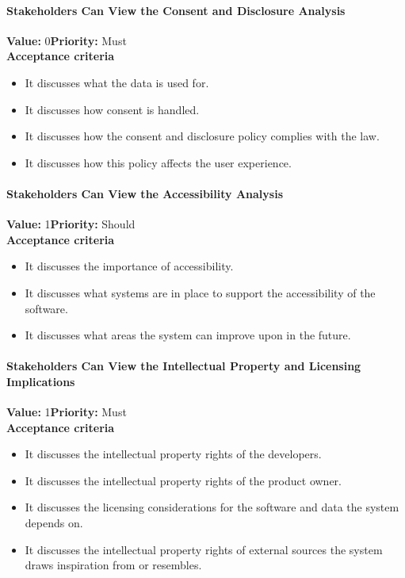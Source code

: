 \paragraph{Stakeholders Can View the Consent and Disclosure Analysis}
\textbf{Value:} 0\quad \textbf{Priority:} Must\\
\textbf{Acceptance criteria}
\begin{itemize}
  \item It discusses what the data is used for.
  \item It discusses how consent is handled.
  \item It discusses how the consent and disclosure policy complies with the law.
  \item It discusses how this policy affects the user experience.
\end{itemize}

\paragraph{Stakeholders Can View the Accessibility Analysis}
\textbf{Value:} 1\quad \textbf{Priority:} Should\\
\textbf{Acceptance criteria}
\begin{itemize}
  \item It discusses the importance of accessibility.
  \item It discusses what systems are in place to support the accessibility of the software.
  \item It discusses what areas the system can improve upon in the future.
\end{itemize}

\paragraph{Stakeholders Can View the Intellectual Property and Licensing Implications}
\textbf{Value:} 1\quad \textbf{Priority:} Must\\
\textbf{Acceptance criteria}
\begin{itemize}
  \item It discusses the intellectual property rights of the developers.
  \item It discusses the intellectual property rights of the product owner.
  \item It discusses the licensing considerations for the software and data the system depends on.
  \item It discusses the intellectual property rights of external sources the system draws inspiration from or resembles.
\end{itemize}

